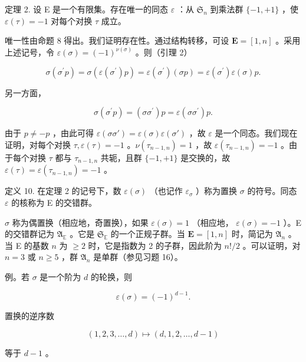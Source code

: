 定理 2. 设 E 是一个有限集。存在唯一的同态 \(\varepsilon\) ：从 \(\mathfrak{S}_n\) 到乘法群 \(\{-1, +1\}\) ，使 \(\varepsilon(\tau) = -1\) 对每个对换 \(\tau\) 成立。

唯一性由命题 8 得出。我们证明存在性。通过结构转移，可设 \(\mathbf{E} = [1, n]\) 。采用上述记号，令 \(\varepsilon(\sigma) = (-1)^{\nu(\sigma)}\) 。则（引理 2）

\[
\sigma (\sigma^ {\prime} p) = \sigma (\varepsilon (\sigma^ {\prime}) p) = \varepsilon (\sigma^ {\prime}) (\sigma p) = \varepsilon (\sigma^ {\prime}) \varepsilon (\sigma) p.
\]

另一方面，

\[
\sigma (\sigma^ {\prime} p) = (\sigma \sigma^ {\prime}) p = \varepsilon (\sigma \sigma^ {\prime}) p.
\]

由于 \(p \neq -p\) ，由此可得 \(\varepsilon(\sigma\sigma') = \varepsilon(\sigma)\varepsilon(\sigma')\) ，故 \(\varepsilon\) 是一个同态。我们现在证明，对每个对换 \(\tau, \varepsilon(\tau) = -1\) 。\(\nu(\tau_{n-1,n}) = 1\) ，故 \(\varepsilon(\tau_{n-1,n}) = -1\) 。由于每个对换 \(\tau\) 都与 \(\tau_{n-1,n}\) 共轭，且群 \(\{-1, +1\}\) 是交换的，故 \(\varepsilon(\tau) = \varepsilon(\tau_{n-1,n}) = -1\) 。

定义 10. 在定理 2 的记号下，数 \(\varepsilon(\sigma)\) （也记作 \(\varepsilon_{\sigma}\) ）称为置换 \(\sigma\) 的符号。同态 \(\varepsilon\) 的核称为 E 的交错群。

\(\sigma\) 称为偶置换（相应地，奇置换），如果 \(\varepsilon(\sigma) = 1\) （相应地， \(\varepsilon(\sigma) = -1\) ）。E 的交错群记为 \(\mathfrak{A}_{\mathbb{E}}\) 。它是 \(\mathfrak{S}_{\mathbb{E}}\) 的一个正规子群。当 \(\mathbf{E} = [1, n]\) 时，简记为 \(\mathfrak{A}_{n}\) 。当 E 的基数 \(n\) 为 \(\geqslant 2\) 时，它是指数为 2 的子群，因此阶为 \(n! / 2\) 。可以证明，对 \(n = 3\) 或 \(n \geqslant 5\) ，群 \(\mathfrak{A}_{n}\) 是单群（参见习题 16）。

例。若 \(\sigma\) 是一个阶为 \(d\) 的轮换，则

\[
\varepsilon (\sigma) = (- 1) ^ {d - 1}.
\]

置换的逆序数

\[
(1, 2, 3, \dots , d) \mapsto (d, 1, 2, \dots , d - 1)
\]

等于 \(d - 1\) 。


